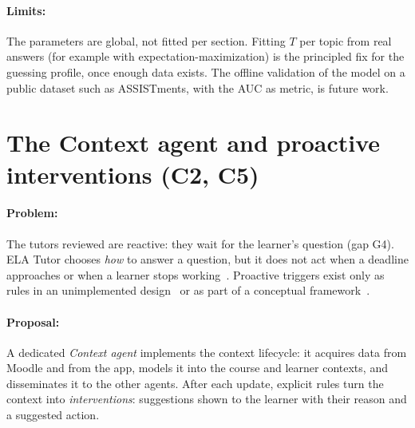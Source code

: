 \paragraph{Limits:} The parameters are global, not fitted per section.
Fitting $T$ per topic from real answers (for example with
expectation-maximization) is the principled fix for the guessing profile,
once enough data exists. The offline validation of the model on a public
dataset such as ASSISTments, with the AUC as metric, is future work.

\section[The Context agent and proactive interventions]{The Context agent and proactive interventions (C2, C5)}
\label{sec-c2}

\paragraph{Problem:} The tutors reviewed are reactive: they wait for the
learner's question (gap G4). ELA Tutor chooses \emph{how} to answer a
question, but it does not act when a deadline approaches or when a
learner stops working~\cite{lopezgoyez2026ela}. Proactive triggers exist
only as rules in an unimplemented design~\cite{khaddar2026ijacsa} or as
part of a conceptual framework~\cite{sharif2026camadrl}.

\paragraph{Proposal:} A dedicated \emph{Context agent} implements the
context lifecycle: it acquires data from Moodle and from the app, models
it into the course and learner contexts, and disseminates it to the other
agents. After each update, explicit rules turn the context into
\emph{interventions}: suggestions shown to the learner with their reason
and a suggested action.

